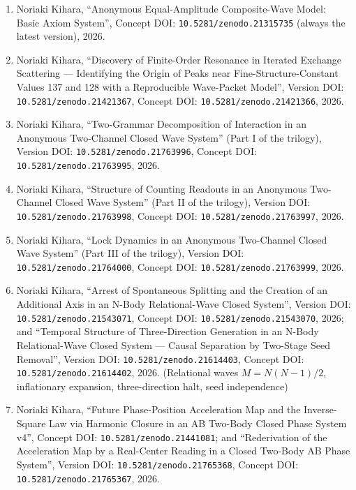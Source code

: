 \documentclass[
  a4paper,
]{article}
\providecommand{\tightlist}{%
  \setlength{\itemsep}{0pt}\setlength{\parskip}{0pt}}
\begin{document}
\begin{enumerate}
\def\labelenumi{\arabic{enumi}.}
\tightlist
\item
  Noriaki Kihara, ``Anonymous Equal-Amplitude Composite-Wave Model:
  Basic Axiom System'', Concept DOI: \texttt{10.5281/zenodo.21315735}
  (always the latest version), 2026.
\item
  Noriaki Kihara, ``Discovery of Finite-Order Resonance in Iterated
  Exchange Scattering --- Identifying the Origin of Peaks near
  Fine-Structure-Constant Values 137 and 128 with a Reproducible
  Wave-Packet Model'', Version DOI: \texttt{10.5281/zenodo.21421367},
  Concept DOI: \texttt{10.5281/zenodo.21421366}, 2026.
\item
  Noriaki Kihara, ``Two-Grammar Decomposition of Interaction in an
  Anonymous Two-Channel Closed Wave System'' (Part I of the trilogy),
  Version DOI: \texttt{10.5281/zenodo.21763996}, Concept DOI:
  \texttt{10.5281/zenodo.21763995}, 2026.
\item
  Noriaki Kihara, ``Structure of Counting Readouts in an Anonymous
  Two-Channel Closed Wave System'' (Part II of the trilogy), Version
  DOI: \texttt{10.5281/zenodo.21763998}, Concept DOI:
  \texttt{10.5281/zenodo.21763997}, 2026.
\item
  Noriaki Kihara, ``Lock Dynamics in an Anonymous Two-Channel Closed
  Wave System'' (Part III of the trilogy), Version DOI:
  \texttt{10.5281/zenodo.21764000}, Concept DOI:
  \texttt{10.5281/zenodo.21763999}, 2026.
\item
  Noriaki Kihara, ``Arrest of Spontaneous Splitting and the Creation of
  an Additional Axis in an N-Body Relational-Wave Closed System'',
  Version DOI: \texttt{10.5281/zenodo.21543071}, Concept DOI:
  \texttt{10.5281/zenodo.21543070}, 2026; and ``Temporal Structure of
  Three-Direction Generation in an N-Body Relational-Wave Closed System
  --- Causal Separation by Two-Stage Seed Removal'', Version DOI:
  \texttt{10.5281/zenodo.21614403}, Concept DOI:
  \texttt{10.5281/zenodo.21614402}, 2026. (Relational waves
  \(M=N(N-1)/2\), inflationary expansion, three-direction halt, seed
  independence)
\item
  Noriaki Kihara, ``Future Phase-Position Acceleration Map and the
  Inverse-Square Law via Harmonic Closure in an AB Two-Body Closed Phase
  System v4'', Concept DOI: \texttt{10.5281/zenodo.21441081}; and
  ``Rederivation of the Acceleration Map by a Real-Center Reading in a
  Closed Two-Body AB Phase System'', Version DOI:
  \texttt{10.5281/zenodo.21765368}, Concept DOI:
  \texttt{10.5281/zenodo.21765367}, 2026.

\end{enumerate}
\end{document}
